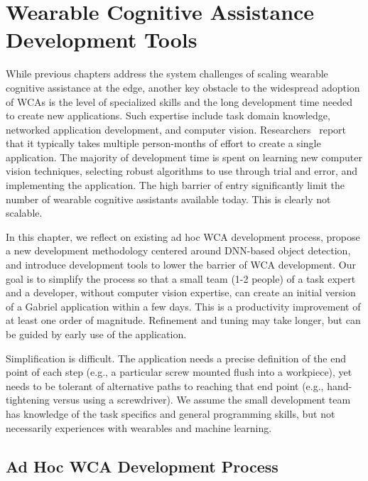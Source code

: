 \chapter{Wearable Cognitive Assistance Development Tools}
\label{chapter: app-dev}

While previous chapters address the system challenges of scaling wearable
cognitive assistance at the edge, another key obstacle to the widespread
adoption of WCAs is the level of specialized skills and the long development
time needed to create new applications. Such expertise include task domain
knowledge, networked application development, and computer vision.
Researchers~\cite{chen2018application} report that it typically takes multiple
person-months of effort to create a single application. The majority of
development time is spent on learning new computer vision techniques, selecting
robust algorithms to use through trial and error, and implementing the
application. The high barrier of entry significantly limit the number of
wearable cognitive assistants available today. This is clearly not scalable. 

In this chapter, we reflect on existing ad hoc WCA development process, propose
a new development methodology centered around DNN-based object detection, and
introduce development tools to lower the barrier of WCA development. Our goal is
to simplify the process so that a small team (1-2 people) of a task expert and a
developer, without computer vision expertise, can create an initial version of a
Gabriel application within a few days. This is a productivity improvement of at
least one order of magnitude. Refinement and tuning may take longer, but can be
guided by early use of the application. 

Simplification is difficult. The application needs a precise definition of the
end point of each step (e.g., a particular screw mounted flush into a
workpiece), yet needs to be tolerant of alternative paths to reaching that end
point (e.g., hand-tightening versus using a screwdriver). We assume the small
development team has knowledge of the task specifics and general programming
skills, but not necessarily experiences with wearables and machine learning.

\section{Ad Hoc WCA Development Process}
\label{sec: app-dev-adhoc}

